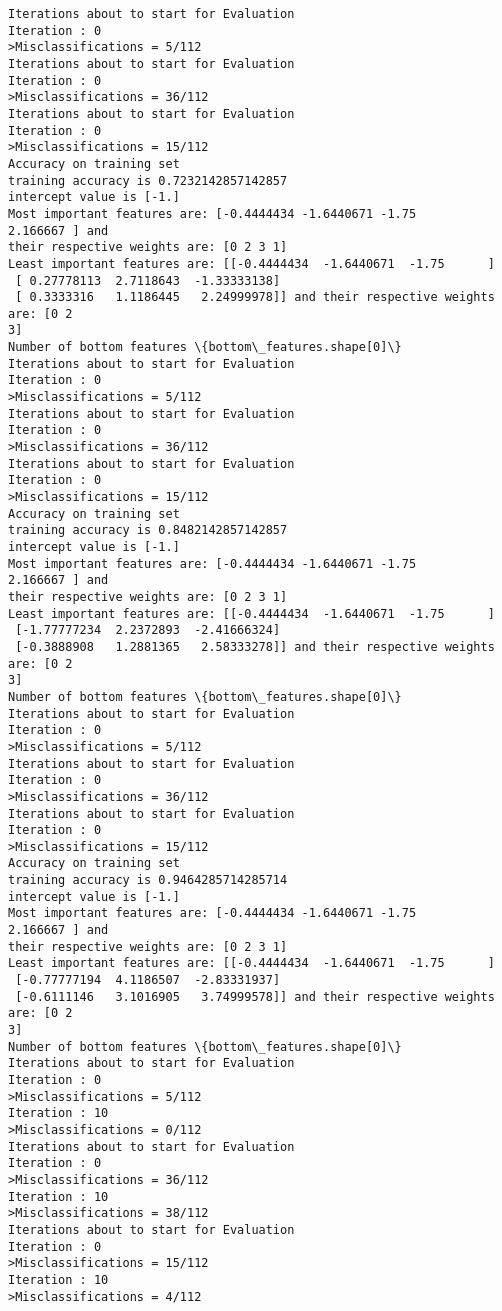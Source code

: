 \documentclass[11pt]{article}
\begin{document}
    \begin{Verbatim}[commandchars=\\\{\}]
Iterations about to start for Evaluation
Iteration : 0
>Misclassifications = 5/112
Iterations about to start for Evaluation
Iteration : 0
>Misclassifications = 36/112
Iterations about to start for Evaluation
Iteration : 0
>Misclassifications = 15/112
Accuracy on training set
training accuracy is 0.7232142857142857
intercept value is [-1.]
Most important features are: [-0.4444434 -1.6440671 -1.75       2.166667 ] and
their respective weights are: [0 2 3 1]
Least important features are: [[-0.4444434  -1.6440671  -1.75      ]
 [ 0.27778113  2.7118643  -1.33333138]
 [ 0.3333316   1.1186445   2.24999978]] and their respective weights are: [0 2
3]
Number of bottom features \{bottom\_features.shape[0]\}
Iterations about to start for Evaluation
Iteration : 0
>Misclassifications = 5/112
Iterations about to start for Evaluation
Iteration : 0
>Misclassifications = 36/112
Iterations about to start for Evaluation
Iteration : 0
>Misclassifications = 15/112
Accuracy on training set
training accuracy is 0.8482142857142857
intercept value is [-1.]
Most important features are: [-0.4444434 -1.6440671 -1.75       2.166667 ] and
their respective weights are: [0 2 3 1]
Least important features are: [[-0.4444434  -1.6440671  -1.75      ]
 [-1.77777234  2.2372893  -2.41666324]
 [-0.3888908   1.2881365   2.58333278]] and their respective weights are: [0 2
3]
Number of bottom features \{bottom\_features.shape[0]\}
Iterations about to start for Evaluation
Iteration : 0
>Misclassifications = 5/112
Iterations about to start for Evaluation
Iteration : 0
>Misclassifications = 36/112
Iterations about to start for Evaluation
Iteration : 0
>Misclassifications = 15/112
Accuracy on training set
training accuracy is 0.9464285714285714
intercept value is [-1.]
Most important features are: [-0.4444434 -1.6440671 -1.75       2.166667 ] and
their respective weights are: [0 2 3 1]
Least important features are: [[-0.4444434  -1.6440671  -1.75      ]
 [-0.77777194  4.1186507  -2.83331937]
 [-0.6111146   3.1016905   3.74999578]] and their respective weights are: [0 2
3]
Number of bottom features \{bottom\_features.shape[0]\}
Iterations about to start for Evaluation
Iteration : 0
>Misclassifications = 5/112
Iteration : 10
>Misclassifications = 0/112
Iterations about to start for Evaluation
Iteration : 0
>Misclassifications = 36/112
Iteration : 10
>Misclassifications = 38/112
Iterations about to start for Evaluation
Iteration : 0
>Misclassifications = 15/112
Iteration : 10
>Misclassifications = 4/112

\end{Verbatim}
\end{document}
